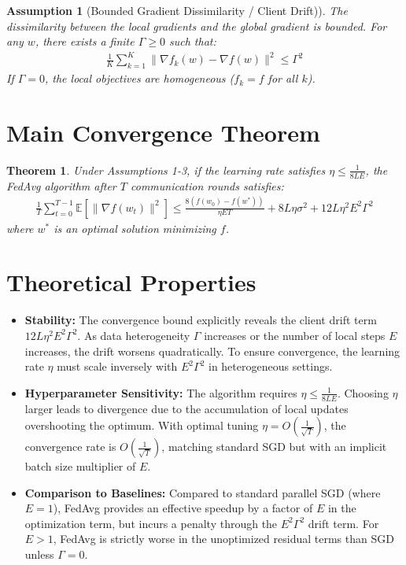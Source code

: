 \documentclass{article}
\newtheorem{theorem}{Theorem}
\newtheorem{assumption}{Assumption}
\begin{document}
\begin{assumption}[Bounded Gradient Dissimilarity / Client Drift)]
The dissimilarity between the local gradients and the global gradient is bounded. For any $w$, there exists a finite $\Gamma \geq 0$ such that:
\begin{align*}
    \frac{1}{K} \sum_{k=1}^K \|\nabla f_k(w) - \nabla f(w)\|^2 \leq \Gamma^2
\end{align*}
If $\Gamma = 0$, the local objectives are homogeneous ($f_k = f$ for all $k$).
\end{assumption}

\section*{Main Convergence Theorem}
\begin{theorem}
Under Assumptions 1-3, if the learning rate satisfies $\eta \leq \frac{1}{8 L E}$, the FedAvg algorithm after $T$ communication rounds satisfies:
\begin{align*}
    \frac{1}{T} \sum_{t=0}^{T-1} \mathbb{E}[\|\nabla f(w_t)\|^2] \leq \frac{8(f(w_0) - f(w^*))}{\eta E T} + 8 L \eta \sigma^2 + 12 L \eta^2 E^2 \Gamma^2
\end{align*}
where $w^*$ is an optimal solution minimizing $f$.
\end{theorem}

\section*{Theoretical Properties}
\begin{itemize}
    \item \textbf{Stability:} The convergence bound explicitly reveals the client drift term $12 L \eta^2 E^2 \Gamma^2$. As data heterogeneity $\Gamma$ increases or the number of local steps $E$ increases, the drift worsens quadratically. To ensure convergence, the learning rate $\eta$ must scale inversely with $E^2 \Gamma^2$ in heterogeneous settings.
    \item \textbf{Hyperparameter Sensitivity:} The algorithm requires $\eta \leq \frac{1}{8 L E}$. Choosing $\eta$ larger leads to divergence due to the accumulation of local updates overshooting the optimum. With optimal tuning $\eta = O(\frac{1}{\sqrt{T}})$, the convergence rate is $O(\frac{1}{\sqrt{T}})$, matching standard SGD but with an implicit batch size multiplier of $E$.
    \item \textbf{Comparison to Baselines:} Compared to standard parallel SGD (where $E=1$), FedAvg provides an effective speedup by a factor of $E$ in the optimization term, but incurs a penalty through the $E^2 \Gamma^2$ drift term. For $E>1$, FedAvg is strictly worse in the unoptimized residual terms than SGD unless $\Gamma=0$.
\end{itemize}
\end{document}
